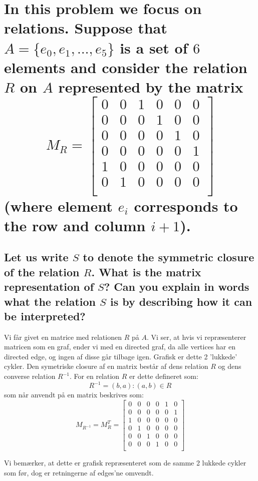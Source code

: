 \documentclass[a4paper,12pt]{article}
\begin{document}
\section[Question 4]{In this problem we focus on relations. Suppose that $A = \{e_0,e_1,\dots,e_5\}$ is a set of
$6$ elements and consider the relation $R$ on $A$ represented by the matrix
\[M_R = 
    \begin{bmatrix}
        0 & 0 & 1 & 0 & 0 & 0 \\
        0 & 0 & 0 & 1 & 0 & 0 \\
        0 & 0 & 0 & 0 & 1 & 0 \\
        0 & 0 & 0 & 0 & 0 & 1 \\
        1 & 0 & 0 & 0 & 0 & 0 \\
        0 & 1 & 0 & 0 & 0 & 0 \\
    \end{bmatrix}
\]
(where element $e_i$ corresponds to the row and column $i+1$).}
\subsection[]{Let us write $S$ to denote the symmetric closure of the relation $R$. 
What is the matrix representation of $S$? Can you explain in words what the relation $S$ is by describing how it can be interpreted?
}

Vi får givet en matrice med relationen $R$ på $A$. Vi ser, at hvis vi repræsenterer matricen som en graf, ender vi med en directed graf, da alle vertices har en directed edge, og ingen af disse går tilbage igen. Grafisk er dette 2 'lukkede' cykler. Den symetriske closure af en matrix består af dens relation $R$ og dens converse relation $R^{-1}$. For en relation $R$ er dette defineret som: 
\[ R^{-1} = (b,a) : (a,b) \in R\]
som når anvendt på en matrix beskrives som:
\[M_{R^{-1}} = M_{R}^T = 
    \begin{bmatrix}
        0 & 0 & 0 & 0 & 1 & 0 \\
        0 & 0 & 0 & 0 & 0 & 1 \\
        1 & 0 & 0 & 0 & 0 & 0 \\
        0 & 1 & 0 & 0 & 0 & 0 \\
        0 & 0 & 1 & 0 & 0 & 0 \\
        0 & 0 & 0 & 1 & 0 & 0 \\
    \end{bmatrix}
\]

Vi bemærker, at dette er grafisk repræsenteret som de samme 2 lukkede cykler som før, dog er retningerne af edges'ne omvendt.
\end{document}
